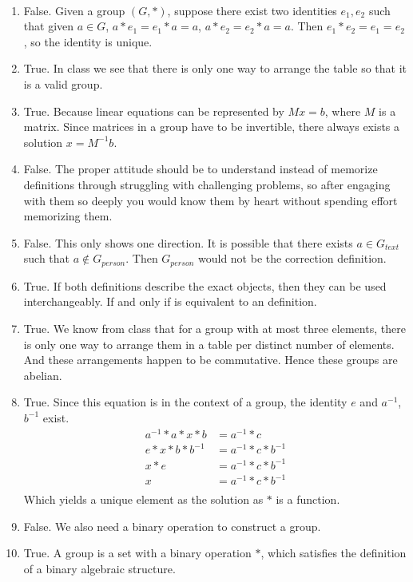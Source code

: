 \documentclass[12pt]{article}
\begin{document}
\begin{problem}[4.25]
~\begin{enumerate}[label=\alph*)]
	\item False. Given a group $(G,*)$, suppose there exist two identities  $e_1,e_2$ such that  given $a \in G$, $a*e_1=e_1*a=a$, $a*e_2=e_2*a=a$. Then $e_1*e_2 = e_1 = e_2$, so the identity is unique.
	\item True. In class we see that there is only one way to arrange the table so that it is a valid group.
	\item True. Because linear equations can be represented by $Mx = b$, where  $M$ is a matrix. Since matrices in a group have to be invertible, there always exists a solution  $x = M^{-1} b$.
	\item False. The proper attitude should be to understand instead of memorize definitions through struggling with challenging problems, so after engaging with them so deeply you would know them by heart without spending effort memorizing them.
	\item False. This only shows one direction. It is possible that there exists $a \in G_{text}$ such that $a \not \in G_{person}$. Then $G_{person}$ would not be the correction definition.
	\item True. If both definitions describe the exact objects, then they can be used interchangeably. If and only if is equivalent to an definition.
	\item True. We know from class that for a group with at most three elements, there is only one way to arrange them in a table per distinct number of elements. And these arrangements happen to be commutative. Hence these groups are abelian. 
	\item True. Since this equation is in the context of a group, the identity $e$ and $a^{-1}$, $b^{-1}$ exist.
		 \begin{align*}
			 a^{-1} * a*x*b&=a^{-1} * c \\
			 e*x*b*b ^{-1} &= a^{-1} * c*b ^{-1}\\
			 x*e &= a^{-1} * c * b ^{-1} \\
			 x&= a^{-1} * c * b ^{-1} \\
		\end{align*}
		Which yields a unique element as the solution as $*$ is a function.
	\item False. We also need a binary operation to construct a group.
	\item True. A group is a set with a binary operation $*$, which satisfies the definition of  a binary algebraic structure.
\end{enumerate}
\end{problem}
\end{document}

